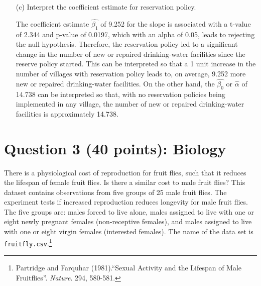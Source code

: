 \documentclass[12pt,letterpaper]{article}
\begin{document}
\begin{enumerate}
	\item [(c)] Interpret the coefficient estimate for reservation policy. 
	\vspace{.5cm}
	
	The coefficient estimate $\hat{\beta_1}$ of 9.252 for the slope is associated with a t-value of 2.344 and p-value of 0.0197, which with an alpha of 0.05, leads to rejecting the null hypothesis. Therefore, the reservation policy led to a significant change in the number of new or repaired drinking-water facilities since the reserve policy started. This can be interpreted so that a 1 unit increase in the number of villages with reservation policy leads to, on average, 9.252 more new or repaired drinking-water facilities. On the other hand, the $\hat{\beta_0}$ or $\hat{\alpha}$ of 14.738 can be interpreted so that, with no reservation policies being implemented in any village, the number of new or repaired drinking-water facilities is approximately 14.738.
	
	\vspace{.5cm}
\end{enumerate}

\newpage
	\section*{Question 3 (40 points): Biology}

There is a physiological cost of reproduction for fruit flies, such that it reduces the lifespan of female fruit flies.  Is there a similar cost to male fruit flies?  This dataset contains observations from five groups of 25 male fruit flies. The experiment tests if increased reproduction reduces longevity for male fruit flies. The five groups are: males forced to live alone, males assigned to live with one or eight newly pregnant females (non-receptive females), and males assigned to live with one or eight virgin females (interested females). The name of the data set is \texttt{fruitfly.csv}.\footnote{Partridge and Farquhar (1981).``Sexual Activity and the Lifespan of Male Fruitflies''. \textit{Nature}. 294, 580-581.}
	\vspace{1cm}
\end{document}
